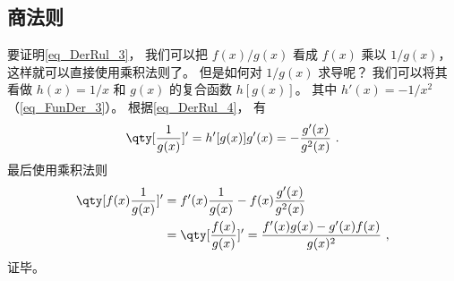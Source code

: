 \subsection{商法则}
要证明\autoref{eq_DerRul_3}， 我们可以把 $f(x)/g(x)$ 看成 $f(x)$ 乘以 $1/g(x)$， 这样就可以直接使用乘积法则了。 但是如何对 $1/g(x)$ 求导呢？ 我们可以将其看做 $h(x) = 1/x$ 和 $g(x)$ 的复合函数 $h[g(x)]$。 其中 $h'(x) = -1/x^2$（\autoref{eq_FunDer_3}）。 根据\autoref{eq_DerRul_4}， 有
\begin{equation}
\qty[\frac{1}{g(x)}]' = h'[g(x)]g'(x) = -\frac{g'(x)}{g^2(x)}~.
\end{equation}
最后使用乘积法则
\begin{equation}
\begin{aligned}
\qty[f(x) \frac{1}{g(x)}]' &= f'(x) \frac{1}{g(x)} - f(x) \frac{g'(x)}{g^2(x)}\\
&= \qty[ \frac{f(x)}{g(x)} ]'  = \frac{f'(x)g(x) - g'(x)f(x)}{g(x)^2}~,
\end{aligned}
\end{equation}
证毕。
